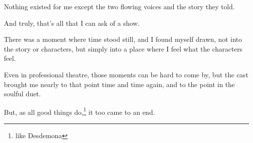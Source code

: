 \documentclass[12pt]{article}[titlepage]
\newcommand{\1}{\={a}}
\newcommand{\2}{\={e}}
\newcommand{\3}{\={\i}}
\newcommand{\4}{\=o}
\newcommand{\5}{\=u}
\newcommand{\6}{\={A}}
\renewcommand{\,}{\textsuperscript{,}}
\begin{document}
Nothing existed for me except the two flowing voices and the story they told.


And truly, that’s all that I can ask of a show.

There was a moment where time stood still, and I found myself drawn, not into the story or characters, but simply into a place where I feel what the characters feel.

Even in professional theatre, those moments can be hard to come by, but the cast brought me nearly to that point time and time again, and to the point in the soulful duet.

But, as all good things do,\footnote{like Desdemona} it too came to an end.
\end{document}
